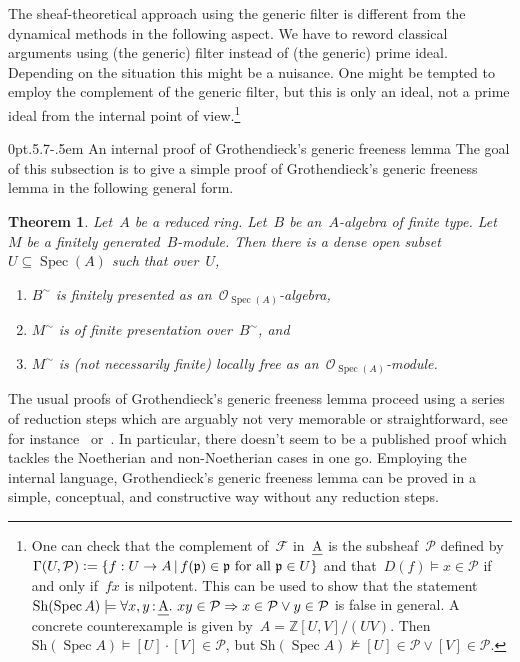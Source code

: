 \documentclass[10pt,reqno,a4paper]{amsbook}
\makeatletter
\theoremstyle{definition}
\theoremstyle{plain}
\newtheorem{thm}[defn]{Theorem}
\theoremstyle{remark}
\newcommand{\ZZ}{\mathbb{Z}}
\newcommand{\F}{\mathcal{F}}
\renewcommand{\O}{\mathcal{O}}
\renewcommand{\P}{\mathcal{P}}
\newcommand{\ppp}{\mathfrak{p}}
\let\oldul\ul
\renewcommand{\ul}[1]{\text{\oldul{$#1$}}}
\newcommand{\Sh}{\mathrm{Sh}}
\DeclareMathOperator{\Spec}{Spec}
\newcommand{\?}{\,{:}\,}
\renewcommand{\_}{\mathpunct{.}\,}
\newcommand{\stacksproject}[1]{\cite[{\href{http://stacks.math.columbia.edu/tag/#1}{Tag~#1}}]{stacks-project}}
\newcommand{\defeq}{\vcentcolon=}
\def\subsection{\@startsection{subsection}{2}%
  {0pt}{.5\linespacing\@plus.7\linespacing}{-.5em}%
  {\normalfont\bfseries}}
\makeatother
\begin{document}
The sheaf-theoretical approach using the generic filter is different from the
dynamical methods in the following aspect. We have to reword classical
arguments using (the generic) filter instead of (the generic) prime ideal.
Depending on the situation this might be a nuisance. One might be tempted to
employ the complement of the generic filter, but this is only an ideal, not a
prime ideal from the internal point of view.\footnote{One can check that the
complement of~$\F$ in~$\ul{A}$ is the subsheaf~$\P$ defined by~$\Gamma(U, \P)
\defeq \{ f : U \to A \,|\, \text{$f(\ppp) \in \ppp$ for all~$\ppp \in U$} \}$
and that~$D(f) \models x \in \P$ if and only if~$fx$ is nilpotent. This can be
used to show that the statement~$\Sh(\Spec A) \models \forall x,y\?\ul{A}\_ xy
\in \P \Rightarrow x \in \P \vee y \in \P$ is false in general. A concrete
counterexample is given by~$A = \ZZ[U,V]/(UV)$. Then~$\Sh(\Spec A) \models [U]
\cdot [V] \in \P$, but $\Sh(\Spec A) \not\models [U] \in \P \vee [V] \in \P$.}


\subsection{An internal proof of Grothendieck's generic freeness lemma}\label{sect:generic-freeness}
The goal of this subsection is to give a simple proof of Grothendieck's generic
freeness lemma in the following general form.

\begin{thm}\label{thm:generic-freeness}
Let~$A$ be a reduced ring. Let~$B$ be an~$A$-algebra of finite type.
Let~$M$ be a finitely generated~$B$-module. Then there is a dense open
subset~$U \subseteq \Spec(A)$ such that over~$U$,
\begin{enumerate}
\item $B^\sim$ is finitely presented as an~$\O_{\Spec(A)}$-algebra,
\item $M^\sim$ is of finite presentation over~$B^\sim$, and
\item $M^\sim$ is (not necessarily finite) locally free as an~$\O_{\Spec(A)}$-module.
\end{enumerate}
\end{thm}

The usual proofs of Grothendieck's generic freeness lemma proceed using a series
of reduction steps which are arguably not very memorable or
straightforward, see for instance~\stacksproject{051Q}
or~\cite{staats:generic-freeness}. In particular, there doesn't seem to be a
published proof which tackles the Noetherian and non-Noetherian cases in one go.
Employing the internal language, Grothendieck's generic freeness lemma can be
proved in a simple, conceptual, and constructive way without any reduction steps.
\end{document}
